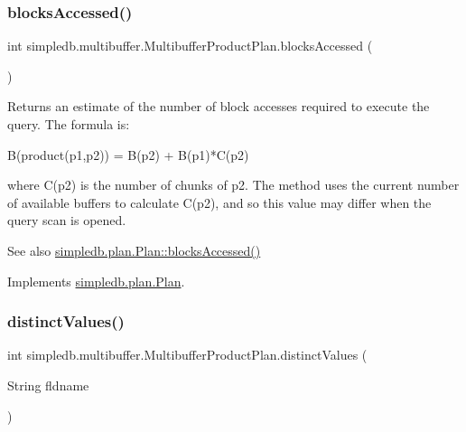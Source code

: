\subsubsection{\texorpdfstring{blocks\+Accessed()}{blocksAccessed()}}
{\footnotesize\ttfamily int simpledb.\+multibuffer.\+Multibuffer\+Product\+Plan.\+blocks\+Accessed (\begin{DoxyParamCaption}{ }\end{DoxyParamCaption})\hspace{0.3cm}{\ttfamily [inline]}}

Returns an estimate of the number of block accesses required to execute the query. The formula is\+: 
\begin{DoxyPre} B(product(p1,p2)) = B(p2) + B(p1)*C(p2) \end{DoxyPre}
 where C(p2) is the number of chunks of p2. The method uses the current number of available buffers to calculate C(p2), and so this value may differ when the query scan is opened. \begin{DoxySeeAlso}{See also}
\hyperlink{interfacesimpledb_1_1plan_1_1Plan_a6a333b95b956fe224812155b9d1c8202}{simpledb.\+plan.\+Plan\+::blocks\+Accessed()} 
\end{DoxySeeAlso}


Implements \hyperlink{interfacesimpledb_1_1plan_1_1Plan_a6a333b95b956fe224812155b9d1c8202}{simpledb.\+plan.\+Plan}.

\mbox{\label{classsimpledb_1_1multibuffer_1_1MultibufferProductPlan_a94df401d9ea9f4da99e4851fc5be731a}} 
\subsubsection{\texorpdfstring{distinct\+Values()}{distinctValues()}}
{\footnotesize\ttfamily int simpledb.\+multibuffer.\+Multibuffer\+Product\+Plan.\+distinct\+Values (\begin{DoxyParamCaption}\item[{String}]{fldname }\end{DoxyParamCaption})\hspace{0.3cm}{\ttfamily [inline]}}


